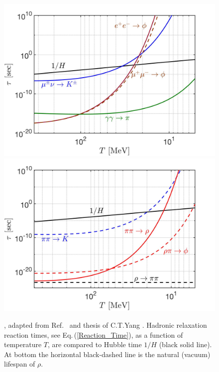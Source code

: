 \begin{figure}[ht]
\centering
\includegraphics[width=1\linewidth]{./plots/Strangeness_Hubble002.jpg}
\includegraphics[width=1\linewidth]{./plots/Strangeness_Hubble003.jpg}
\caption{, adapted from Ref.~\cite{Yang:2021bko} and thesis of C.T.Yang \cite{Yang:2024ret}. Hadronic relaxation reaction times, see Eq.\,(\ref{Reaction_Time}), as a function of temperature $T$, are compared to Hubble time $1/H$ (black solid line). At bottom the horizontal black-dashed line is the natural (vacuum) lifespan of $\rho$.}
\label{reaction_time_tot}
\end{figure}


